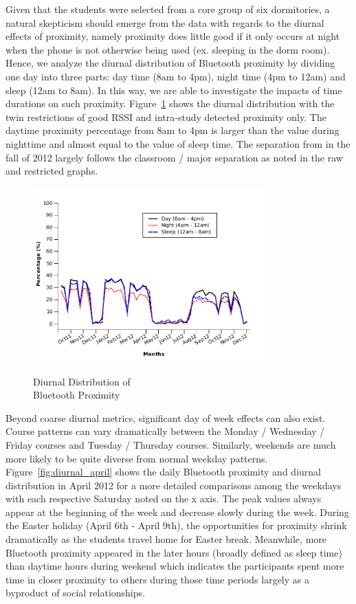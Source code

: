 Given that the students were selected from a core group of six dormitories, a natural skepticism should emerge from the data with regards to the diurnal effects of proximity, namely proximity does little good if it only occurs at night when the phone is not otherwise being used (ex. sleeping in the dorm room).  Hence, we analyze the diurnal distribution of Bluetooth proximity by dividing one day into three parts: day time (8am to 4pm), night time (4pm to 12am) and sleep (12am to 8am). In this way, we are able to investigate the impacts of time durations on such proximity. Figure~\ref{fig:diurnal} shows the diurnal distribution with the twin restrictions of good RSSI and intra-study detected proximity only. The daytime proximity percentage from 8am to 4pm is larger than the value during nighttime and almost equal to the value of sleep time.  The separation from in the fall of 2012 largely follows the classroom / major separation as noted in the raw and restricted graphs. 

\begin{figure}[tbp]
\centering 
{\includegraphics[width=3.5in]{graphs/weekly_bluetooth_diurnal.pdf}}
 \caption{Diurnal Distribution of \\Bluetooth Proximity} 
\label{fig:diurnal}
\end{figure} 

Beyond coarse diurnal metrics, significant day of week effects can also exist. Course patterns can vary dramatically between the Monday / Wednesday / Friday courses and Tuesday / Thursday courses.  Similarly, weekends are much more likely to be quite diverse from normal weekday patterns.  Figure~\ref{fig:diurnal_april} shows the daily Bluetooth proximity and diurnal distribution in April 2012 for a more detailed comparisons among the weekdays with each respective Saturday noted on the x axis. The peak values always appear at the beginning of the week and decrease slowly during the week. During the Easter holiday (April 6th - April 9th), the opportunities for proximity shrink dramatically as the students travel home for Easter break. Meanwhile, more Bluetooth proximity appeared in the later hours (broadly defined as sleep time) than daytime hours during weekend which indicates the participants spent more time in closer proximity to others during those time periods largely as a byproduct of social relationships. 
